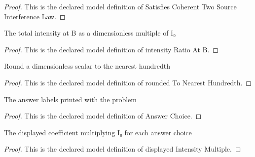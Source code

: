 \begin{proof}
  This is the declared model definition of Satisfies Coherent Two Source Interference Law.
\end{proof}
\begin{definition}
  \label{def:physics:phyx-mini-0246:phyxminiproblems-problemphyxmini0246-intensityratioatb}
  The total intensity at B as a dimensionless multiple of I₀
\end{definition}
\begin{proof}
  This is the declared model definition of intensity Ratio At B.
\end{proof}
\begin{definition}
  \label{def:physics:phyx-mini-0246:phyxminiproblems-problemphyxmini0246-roundedtonearesthundredth}
  Round a dimensionless scalar to the nearest hundredth
\end{definition}
\begin{proof}
  This is the declared model definition of rounded To Nearest Hundredth.
\end{proof}
\begin{definition}
  \label{def:physics:phyx-mini-0246:phyxminiproblems-problemphyxmini0246-answerchoice}
  The answer labels printed with the problem
\end{definition}
\begin{proof}
  This is the declared model definition of Answer Choice.
\end{proof}
\begin{definition}
  \label{def:physics:phyx-mini-0246:phyxminiproblems-problemphyxmini0246-displayedintensitymultiple}
  The displayed coefficient multiplying I₀ for each answer choice
\end{definition}
\begin{proof}
  This is the declared model definition of displayed Intensity Multiple.
\end{proof}
